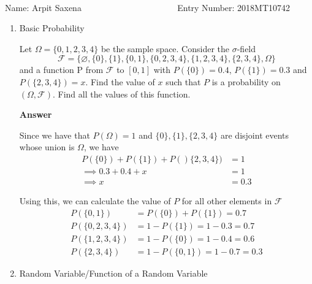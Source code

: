 \documentclass[12pt, oneside]{article}
\begin{document}
\setlength{\textheight}{8.5in}
\\





\vskip 0.5cm

\noindent Name: Arpit Saxena ~~~~~~~~~~~~~~~~~~~~~ Entry Number: 2018MT10742



\vskip 0.5cm



\begin{enumerate}
	




\item {
    Basic Probability

    Let \(\Omega = \{0, 1, 2, 3, 4\}\) be the sample space. Consider the \(\sigma\)-field
    \[\mathcal{F} = \{\varnothing, \{0\}, \{1\}, \{0, 1\}, \{0, 2, 3, 4\}, \{1, 2, 3, 4\}, \{2, 3, 4\}, \Omega\}\]
    and a function P from \(\mathcal{F}\) to \([0, 1]\) with \(P(\{0\}) = 0.4\),
    \(P(\{1\}) = 0.3\) and \(P(\{2, 3, 4\}) = x\). Find the value of \(x\) such that \(P\)
    is a probability on \((\Omega, \mathcal{F})\). Find all the values of this function.

    \textbf{Answer}

    Since we have that \(P(\Omega) = 1\) and \(\{0\}, \{1\}, \{2, 3, 4\}\) are disjoint
    events whose union is \(\Omega\), we have
    \begin{align*}
        P(\{0\}) + P(\{1\}) + P()\{2, 3, 4\}) &= 1 \\
        \implies 0.3 + 0.4 + x &= 1 \\
        \implies x &= 0.3
    \end{align*}

    Using this, we can calculate the value of \(P\) for all other elements in \(\mathcal{F}\)
    \begin{align*}
        P(\{0, 1\}) &= P(\{0\}) + P(\{1\}) = 0.7 \\
        P(\{0, 2, 3, 4\}) &= 1- P(\{1\}) = 1 - 0.3 = 0.7 \\
        P(\{1, 2, 3, 4\}) &= 1 - P(\{0\}) = 1 - 0.4 = 0.6 \\
        P(\{2, 3, 4\}) &= 1 - P(\{0, 1\}) = 1 - 0.7 = 0.3
    \end{align*}
}

\item {
    Random Variable/Function of a Random Variable

}
\end{enumerate}
\end{document}
